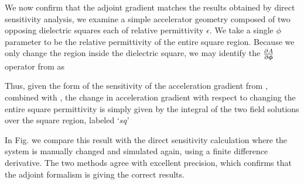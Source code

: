 We now confirm that the adjoint gradient matches the results obtained by direct sensitivity analysis, we examine a simple accelerator geometry composed of two opposing dielectric squares each of relative permittivity $\epsilon$.
We take a single $\phi$ parameter to be the relative permittivity of the entire square region.
Because we only change the region inside the dielectric square, we may identify the $\frac{\partial A}{\partial \bm{\phi}}$ operator from  as
%

Thus, given the form of the sensitivity of the acceleration gradient from , combined with , the change in acceleration gradient with respect to changing the entire square permittivity is simply given by the integral of the two field solutions over the square region, labeled `$sq$'
%

In Fig.  we compare this result with the direct sensitivity calculation where the system is manually changed and simulated again, using a finite difference derivative.
The two methods agree with excellent precision, which confirms that the adjoint formalism is giving the correct results.


